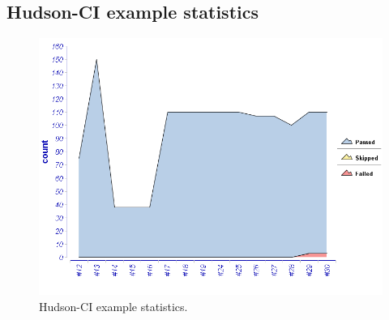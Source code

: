 \documentclass[11pt,british]{article}
\newcommand\blankpage{%
    \null
    \thispagestyle{empty}%
    \addtocounter{page}{-1}%
    \newpage}
\begin{document}
\begin{appendices}
\subsection{Hudson-CI example statistics}
\label{app:hudsonstats}
\begin{figure}[h]
    \centering
	\includegraphics[width=.85\textwidth]{images/hudsonstats.png}
    \caption{Hudson-CI example statistics.}
    \label{fig:Hudson-CI example statistics}
\end{figure}

\end{appendices}


%


\afterpage{\blankpage}
\end{document}
